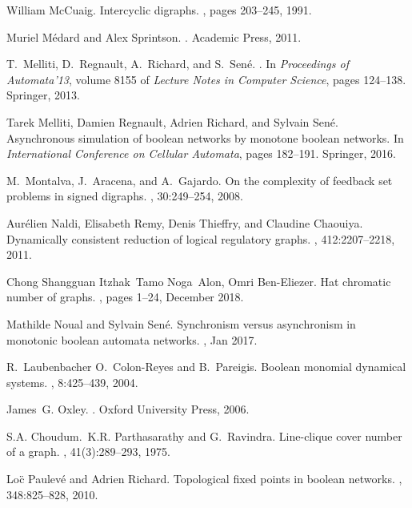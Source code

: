 \documentclass[a4paper, 11pt]{book}
\numberwithin{equation}{section}
\theoremstyle{plain}
\renewcommand{\(}{\ldbrack}
\renewcommand{\)}{\rdbrack}
\begin{document}
\begin{thebibliography}{100}
William McCuaig.
\newblock Intercyclic digraphs.
, pages 203--245, 1991.

Muriel M\'edard and Alex Sprintson.
.
\newblock Academic Press, 2011.

T.~Melliti, D.~Regnault, A.~Richard, and S.~Sen{\'e}.
.
\newblock In {\em Proceedings of Automata'13}, volume 8155 of {\em Lecture
  Notes in Computer Science}, pages 124--138. Springer, 2013.

Tarek Melliti, Damien Regnault, Adrien Richard, and Sylvain Sen{\'e}.
\newblock Asynchronous simulation of boolean networks by monotone boolean
  networks.
\newblock In {\em International Conference on Cellular Automata}, pages
  182--191. Springer, 2016.

M.~Montalva, J.~Aracena, and A.~Gajardo.
\newblock On the complexity of feedback set problems in signed digraphs.
, 30:249--254, 2008.

Aur\'elien Naldi, Elisabeth Remy, Denis Thieffry, and Claudine Chaouiya.
\newblock Dynamically consistent reduction of logical regulatory graphs.
, 412:2207--2218, 2011.

Chong Shangguan Itzhak~Tamo Noga~Alon, Omri Ben-Eliezer.
\newblock Hat chromatic number of graphs.
, pages 1--24, December 2018.

Mathilde Noual and Sylvain Sen{\'e}.
\newblock Synchronism versus asynchronism in monotonic boolean automata
  networks.
, Jan 2017.

R.~Laubenbacher O.~Colon-Reyes and B.~Pareigis.
\newblock Boolean monomial dynamical systems.
, 8:425--439, 2004.

James~G. Oxley.
.
\newblock Oxford University Press, 2006.

S.A. Choudum.~K.R. Parthasarathy and G.~Ravindra.
\newblock Line-clique cover number of a graph.
, 41(3):289--293, 1975.

Lo\"c Paulev\'e and Adrien Richard.
\newblock Topological fixed points in boolean networks.
, 348:825--828, 2010.


\end{thebibliography}
\end{document}
